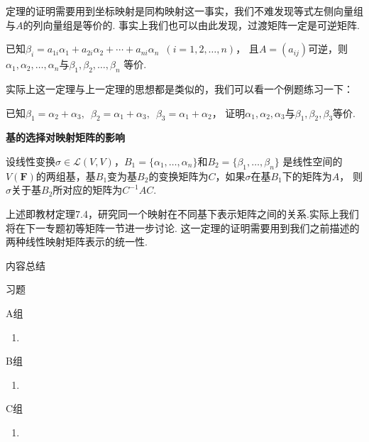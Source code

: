 定理的证明需要用到坐标映射是同构映射这一事实，我们不难发现等式左侧向量组与$A$的列向量组是等价的.
事实上我们也可以由此发现，过渡矩阵一定是可逆矩阵.
\begin{theorem}
    已知$\beta_i=a_{1i}\alpha_1+a_{2i}\alpha_2+\cdots+a_{ni}\alpha_n\enspace(i=1,2,\ldots,n)$，
    且$A=(a_{ij})$可逆，则$\alpha_1,\alpha_2,\ldots,\alpha_n$与$\beta_1,\beta_2,\ldots,\beta_n$
    等价.
\end{theorem}
实际上这一定理与上一定理的思想都是类似的，我们可以看一个例题练习一下：
\begin{example}
    已知$\beta_1=\alpha_2+\alpha_3,\enspace\beta_2=\alpha_1+\alpha_3,\enspace\beta_3=\alpha_1+\alpha_2$，
    证明$\alpha_1,\alpha_2,\alpha_3$与$\beta_1,\beta_2,\beta_3$等价.
\end{example}
\begin{theorem}
    \textbf{\heiti 基的选择对映射矩阵的影响}

    设线性变换$\sigma \in \mathcal{L}(V,V)$，$B_1=\{\alpha_1,\ldots,\alpha_n\}$和$B_2=\{\beta_1,\ldots,\beta_n\}$
    是线性空间的$V(\mathbf{F})$的两组基，基$B_1$变为基$B_2$的变换矩阵为$C$，如果$\sigma$在基$B_1$下的矩阵为$A$，
    则$\sigma$关于基$B_2$所对应的矩阵为$C^{-1}AC$.
\end{theorem}
上述即教材定理7.4，研究同一个映射在不同基下表示矩阵之间的关系.实际上我们将在下一专题初等矩阵一节进一步讨论.
这一定理的证明需要用到我们之前描述的两种线性映射矩阵表示的统一性.

\vspace{2ex}
\centerline{\heiti \Large 内容总结}

\vspace{2ex}

\centerline{\heiti \Large 习题}
\vspace{2ex}
{\kaishu }
\begin{flushright}
    \kaishu

\end{flushright}
\centerline{\heiti A组}
\begin{enumerate}
    \item
\end{enumerate}
\centerline{\heiti B组}
\begin{enumerate}
    \item
\end{enumerate}
\centerline{\heiti C组}
\begin{enumerate}
    \item
\end{enumerate}
